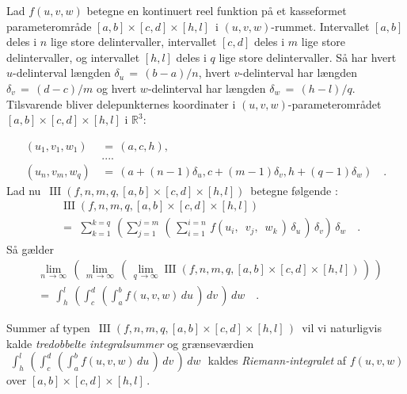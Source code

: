 \begin{theorem} \label{thmIntIntInt}
Lad $f(u, v, w)$ betegne en kontinuert reel funktion
på et kasseformet parameterområde $[a,b] \times [c,d] \times [h, l]\,$ i $(u,
v, w)$-rummet. Intervallet $[a, b]$ deles i $n$ lige
store delintervaller, intervallet $[c, d]$
deles i $m$ lige store delintervaller, og intervallet $[h, l]$ deles i $q$ lige
store delintervaller. Så har
hvert $u$-delinterval længden $\delta_{u} \, = \,
(b-a)/n$, hvert $v$-delinterval har længden
$\delta_{v} \, = \, (d-c)/m$ og hvert $w$-delinterval har længden
$\delta_{w} \, = \, (h-l)/q$. Tilsvarende bliver
delepunkternes koordinater i $(u,
v, w)$-parameter\-om\-rå\-det
$[a,b]\times[c,d]\times [h, l]$ i $\mathbb{R}^{3}$:

\begin{equation}
\begin{aligned}
(u_{1}, v_{1}, w_{1}) \, &= \, (a, c, h), \\
 &.... \\
(u_{n}, v_{m}, w_{q}) \, &= \, (a + (n-1)\delta_{u}, c + (m-1)\delta_{v}, h + (q-1)\delta_{w})
\quad .
\end{aligned}
\end{equation}
 Lad nu $\,\operatorname{III}(f, n, m, q, [a,b] \times [c,d] \times [h, l])\,$ betegne følgende
 {\emph{}}:
\begin{equation}\label{eqIIS2}
\begin{aligned}
&\operatorname{III}(f, n, m, q, [a,b] \times [c,d] \times [h, l]) \\ &=
\,\, \sum_{k=1}^{k=q}\,\left( \sum_{j=1}^{j=m}\, \left( \,\sum_{i=1}^{i=n}\, f\left(u_{i}, \,\,\,
v_{j}, \,\,\, w_{k}\,\right)\, \delta_{u} \,\right) \, \delta_{v} \right)\, \delta_{w} \quad .
\end{aligned}
\end{equation}
Så gælder
\begin{equation} \label{eqDobbeltInt3}
\begin{aligned}
&\lim_{n\, \to \infty}\, \left( \,\lim_{m\, \to \infty} \, \left( \,\lim_{q\, \to \infty}\operatorname{III}(f,n,m,q,
[a,b] \times [c,d] \times [h, l])\,\right)\, \right) \\ &= \, \int_{h}^{l}\, \left(\int_{c}^{d}\, \left(
\int_{a}^{b} f(u,v,w)\, du \, \right)\, dv \, \right)\, dw \quad .
\end{aligned}
\end{equation}
\end{theorem}

Summer af typen $\,\operatorname{III}(f,n,m,q,
[a,b] \times [c,d] \times [h, l]\,)\,$ vil vi naturligvis
kalde {\emph{tredobbelte integralsummer}} og grænseværdien $\,\,\int_{h}^{l}\, \left(\int_{c}^{d}\, \left(
\int_{a}^{b} f(u,v,w)\, du \, \right)\, dv \, \right)\, dw\,\,$ kaldes \emph{Riemann-integralet} af $f(u,v,w)$ over $[a, b]\times [c,d] \times [h, l]\,$.



